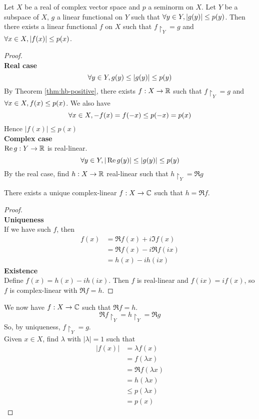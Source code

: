 \documentclass{article}
\begin{document}
\begin{thm}\label{thm:hb-absolute}
  Let $X$ be a real of complex vector space and $p$ a seminorm on $X$. Let $Y$ be a subspace of $X$, $g$ a linear functional on $Y$ such that $\forall y \in Y, |g(y)| \le p(y)$. Then there exists a linear functional $f$ on $X$ such that $f\restriction_Y = g$ and $\forall x \in X, |f(x)| \le p(x)$.
\end{thm}
\begin{proof}~\\
  {\bf Real case}
  $$\forall y \in Y, g(y) \le |g(y)| \le p(y)$$
  By Theorem \ref{thm:hb-positive}, there exists $f : X \to \mathbb R$ such that $f\restriction_Y = g$ and $\forall x \in X, f(x) \le p(x)$. We also have
  $$\forall x \in X, -f(x) = f(-x) \le p(-x) = p(x)$$
  Hence $|f(x)| \le p(x)$ \\
  {\bf Complex case} \\
  $\operatorname{Re} g : Y \to \mathbb R$ is real-linear.
  $$\forall y \in Y, |\operatorname{Re} g(y)| \le |g(y)| \le p(y)$$
  By the real case, find $h : X \to \mathbb R$ real-linear such that $h\restriction_Y = \Re g$
  \begin{claim}
    There exists a unique complex-linear $f : X \to \mathbb C$ such that $h = \Re f$.
  \end{claim}
  \begin{proof}~\\
    {\bf Uniqueness} \\
    If we have such $f$, then
    \begin{align*}
      f(x)
      & = \Re f(x) + i\Im f(x) \\
      & = \Re f(x) - i\Re f(ix) \\
      & = h(x) - ih(ix)
    \end{align*}
    {\bf Existence} \\
    Define $f(x) = h(x) - ih(ix)$. Then $f$ is real-linear and $f(ix) = if(x)$, so $f$ is complex-linear with $\Re f = h$.
  \end{proof}
  We now have $f : X \to \mathbb C$ such that $\Re f = h$.
  $$\Re f\restriction_Y = h\restriction_Y = \Re g$$
  So, by uniqueness, $f\restriction_Y = g$. \\
  Given $x \in X$, find $\lambda$ with $|\lambda| = 1$ such that
  \begin{align*}
    |f(x)|
    & = \lambda f(x) \\
    & = f(\lambda x) \\
    & = \Re f(\lambda x) \\
    & = h(\lambda x) \\
    & \le p(\lambda x) \\
    & = p(x)
  \end{align*}
\end{proof}
\end{document}
